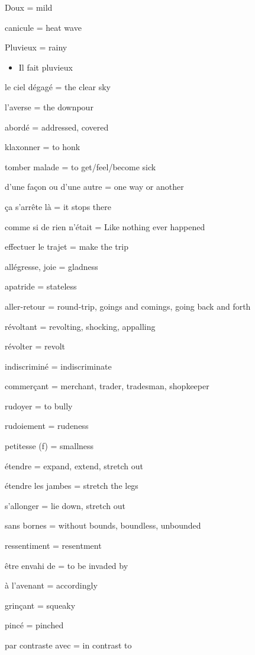 {Doux = mild}

{canicule = heat wave}

{Pluvieux = rainy}

\begin{itemize}
\item
  {Il fait pluvieux~}
\end{itemize}

{le ciel} {dégagé} {= the clear sky}

{l'averse} {= the downpour}

{abordé = addressed, covered}

{klaxonner = to honk}

{tomber malade = to get/feel/become sick}

{d'une façon ou d'une autre = one way or another}

{ça s'arrête là = it stops there}

{comme si de rien n'était = Like nothing ever happened}

{effectuer le trajet = make the trip}

{allégresse, joie = gladness}

{apatride = stateless}

{aller-retour = round-trip, goings and comings, going back and forth}

{révoltant = revolting, shocking, appalling}

{révolter = revolt}

{indiscriminé = indiscriminate}

{commerçant = merchant, trader, tradesman, shopkeeper}

{rudoyer = to bully}

{rudoiement = rudeness}

{petitesse (f) = smallness}

{étendre = expand, extend, stretch out}

{étendre les jambes = stretch the legs}

{s'allonger = lie down, stretch out}

{sans bornes = without bounds, boundless, unbounded}

{ressentiment = resentment}

{être envahi de = to be invaded by}

{à l'avenant = accordingly}

{grinçant = squeaky}

{pincé = pinched}

{par contraste avec = in contrast to}

